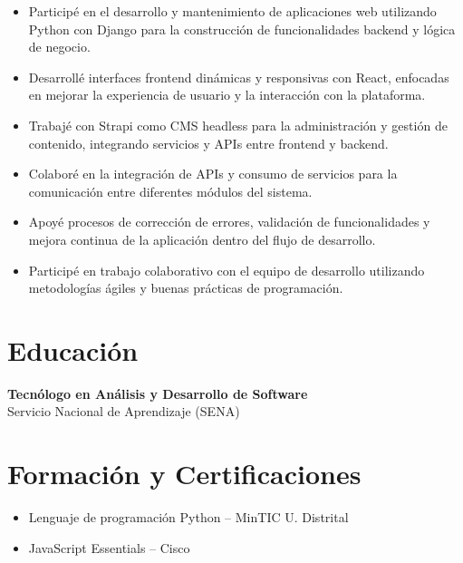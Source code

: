 \documentclass[11pt,a4paper]{article}
\begin{document}
\begin{itemize}[leftmargin=*]
    \item Participé en el desarrollo y mantenimiento de aplicaciones web utilizando Python con Django para la construcción de funcionalidades backend y lógica de negocio.
    
    \item Desarrollé interfaces frontend dinámicas y responsivas con React, enfocadas en mejorar la experiencia de usuario y la interacción con la plataforma.
    
    \item Trabajé con Strapi como CMS headless para la administración y gestión de contenido, integrando servicios y APIs entre frontend y backend.
    
    \item Colaboré en la integración de APIs y consumo de servicios para la comunicación entre diferentes módulos del sistema.
    
    \item Apoyé procesos de corrección de errores, validación de funcionalidades y mejora continua de la aplicación dentro del flujo de desarrollo.
    
    \item Participé en trabajo colaborativo con el equipo de desarrollo utilizando metodologías ágiles y buenas prácticas de programación.
\end{itemize}

\section*{Educación}

\textbf{Tecnólogo en Análisis y Desarrollo de Software}\\
Servicio Nacional de Aprendizaje (SENA)

\section*{Formación y Certificaciones}

\begin{itemize}[leftmargin=*]
    \item Lenguaje de programación Python -- MinTIC U. Distrital
    \item JavaScript Essentials -- Cisco
\end{itemize}
\end{document}

